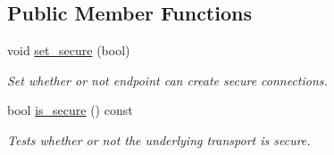 \subsection*{Public Member Functions}
\begin{DoxyCompactItemize}
\item 
void \mbox{\hyperlink{classwebsocketpp_1_1transport_1_1debug_1_1endpoint_aa93a1b98a940de00aadd784b3c058aa6}{set\+\_\+secure}} (bool)
\begin{DoxyCompactList}\small\item\em Set whether or not endpoint can create secure connections. \end{DoxyCompactList}\item 
bool \mbox{\hyperlink{classwebsocketpp_1_1transport_1_1debug_1_1endpoint_a5d9e2b3f36fda6cfbc7b2a8c514ccaa2}{is\+\_\+secure}} () const
\begin{DoxyCompactList}\small\item\em Tests whether or not the underlying transport is secure. \end{DoxyCompactList}\end{DoxyCompactItemize}
